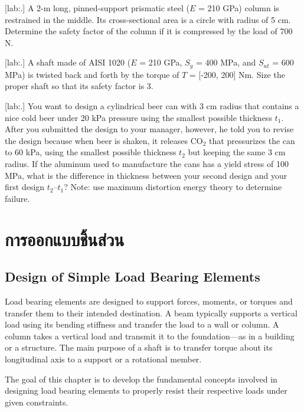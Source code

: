 \documentclass[a4paper,openany,nobib]{tufte-book}
\begin{document}
{{[lab:.] A 2-m long, pinned-support
prismatic steel (\(E\) = 210 GPa) column is restrained in the middle. Its
cross-sectional area is a circle with radius of 5 cm. Determine the
safety factor of the column if it is compressed by the load of 700 N.


[lab:.] A shaft made of AISI 1020
(\(E\) = 210 GPa, \(S_y\) = 400 MPa, and \(S_{ut}\) = 600 MPa) is twisted back
and forth by the torque of \(T\) = [-200, 200] Nm. Size the proper shaft
so that its safety factor is 3.


[lab:.] You want to design a
cylindrical beer can with 3 cm radius that contains a nice cold beer
under 20 kPa pressure using the smallest possible thickness \(t_1\). After
you submitted the design to your manager, however, he told you to revise
the design because when beer is shaken, it releases \(\text{CO}_2\) that
pressurizes the can to 60 kPa, using the smallest possible thickness
\(t_2\) but keeping the same 3 cm radius. If the aluminum used to
manufacture the cans has a yield stress of 100 MPa, what is the
difference in thickness between your second design and your first design
\(t_2 – t_1\)? Note: use maximum distortion energy theory to determine
failure.

\chapter{การออกแบบชิ้นส่วน}
\label{the-components}
\section{Design of Simple Load Bearing Elements}
\label{design-of-simple-load-bearing-elements}
Load bearing elements are designed to support forces, moments, or
torques and transfer them to their intended destination. A beam
typically supports a vertical load using its bending stiffness and
transfer the load to a wall or column. A column takes a vertical load
and transmit it to the foundation---as in a building or a structure. The
main purpose of a shaft is to transfer torque about its longitudinal
axis to a support or a rotational member.

The goal of this chapter is to develop the fundamental concepts involved
in designing load bearing elements to properly resist their respective
loads under given constraints.

}}
\end{document}
